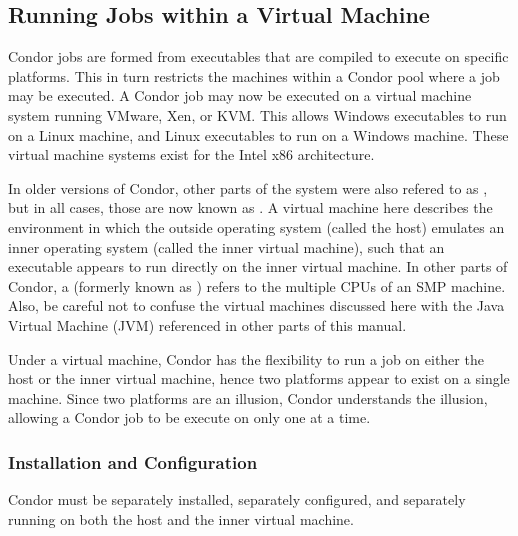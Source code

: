 \subsection{\label{sec:Virtual-Machines}
Running Jobs within a Virtual Machine}

Condor jobs are formed from executables that are compiled to execute
on specific platforms.
This in turn restricts the machines within a Condor pool where
a job may be executed.
A Condor job may now be executed on a 
virtual machine system running VMware, Xen, or KVM.
This allows Windows executables to run on a Linux machine,
and Linux executables to run on a Windows machine.
These virtual machine systems exist for the Intel x86 architecture.

In older versions of Condor, other parts of the system were also
refered to as , but in all cases, those are now
known as .
A virtual machine here describes the environment in which
the outside operating system (called the host) emulates an inner operating
system (called the inner virtual machine),
such that an executable appears to run directly
on the inner virtual machine.
In other parts of Condor, a  (formerly known as
) refers to the multiple CPUs of an SMP
machine.
Also, be careful not to confuse the virtual machines discussed here
with the Java Virtual Machine (JVM) referenced in other parts of this
manual.

Under a virtual machine, 
Condor has the flexibility to run a job on either the host
or the inner virtual machine, 
hence two platforms appear to exist on a single machine.
Since two platforms are an illusion, Condor understands the illusion, 
allowing a Condor job to be execute on only
one at a time.

\subsubsection{\label{sec:Virtual-Machines-Configuration}
Installation and Configuration}

Condor must be separately installed, separately configured,
and separately running on both
the host and the inner virtual machine.

